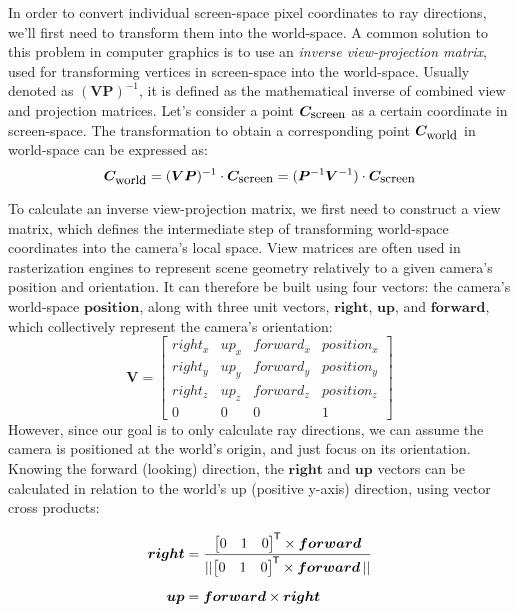 In order to convert individual screen-space pixel coordinates to ray directions, we'll first need to transform them into the world-space.
A common solution to this problem in computer graphics is to use an \textit{inverse view-projection matrix}, used for transforming vertices in screen-space into the world-space.
Usually denoted as $ (\bm{VP})^{-1} $, it is defined as the mathematical inverse of combined view and projection matrices.
Let's consider a point $ \bm{C}_{\textnormal{\small screen}} $ as a certain coordinate in screen-space.
The transformation to obtain a corresponding point $ \bm{C}_{\textnormal{\small world}} $ in world-space can be expressed as:
%
\begin{equation}
    \bm{C}_{\textnormal{\small world}} = (\bm{VP})^{-1} \cdot \bm{C}_{\textnormal{\small screen}} = (\bm{P}^{-1} \bm{V}^{-1}) \cdot \bm{C}_{\textnormal{\small screen}}
\end{equation}

To calculate an inverse view-projection matrix, we first need to construct a view matrix, which defines the intermediate step of transforming world-space coordinates into the camera's local space.
View matrices are often used in rasterization engines to represent scene geometry relatively to a given camera's position and orientation.
It can therefore be built using four vectors: the camera's world-space $ \bm{position} $, along with three unit vectors, $ \bm{right} $, $ \bm{up} $, and $ \bm{forward} $, which collectively represent the camera's orientation:
%
\begin{equation}
    \bm{V} =
    \begin{bmatrix}
        right_x & up_x & forward_x & position_x\\
        right_y & up_y & forward_y & position_y\\
        right_z & up_z & forward_z & position_z\\
        0       & 0    & 0         & 1
    \end{bmatrix}
    \label{eq:Implementation/RayGeneration/view_matrix}
\end{equation}
%
However, since our goal is to only calculate ray directions, we can assume the camera is positioned at the world's origin, and just focus on its orientation.
Knowing the forward (looking) direction, the $ \bm{right} $ and $ \bm{up} $ vectors can be calculated in relation to the world's up (positive y-axis) direction, using vector cross products:  
%
{
    \newcommand*{\worldup}{\begin{bmatrix} 0 & 1 & 0 \end{bmatrix}\tran}
    \begin{align}
        \bm{right} &= \frac{\worldup\times \bm{forward}}{\norm{\worldup\times \bm{forward}\,}}\\[0.5em]
        \bm{up}    &= \bm{forward} \times \bm{right}
    \end{align}
    
}

